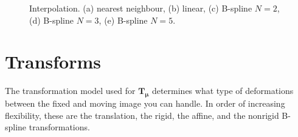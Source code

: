 \documentclass[]{report}
\newcommand{\vmu}{\bm{\mu}}
\newcommand{\vT}{\bm{T}}
\begin{document}
\begin{figure}
\centering
{}\label{sfig:interpolation:nn}
\label{sfig:interpolation:lin}
\label{sfig:interpolation:bs2}
\label{sfig:interpolation:bs3}
\label{sfig:interpolation:bs5}
\caption{Interpolation. (a) nearest neighbour, (b) linear, (c) B-spline $N=2$,
(d) B-spline $N=3$, (e) B-spline $N=5$.} \label{fig:interpolation}
\end{figure}

\section{Transforms}\label{sec:comp:transform}

The transformation model used for $\vT_{\vmu}$ determines what type
of deformations between the fixed and moving image you can handle. In
order of increasing flexibility, these are the translation, the
rigid, the affine, and the nonrigid B-spline transformations.
\end{document}

